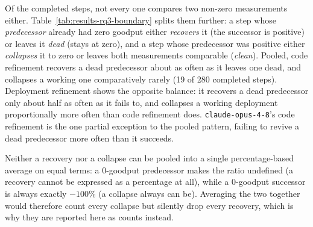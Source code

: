 \begin{table}[H]
  \centering
  \caption{Of the completed steps in Table~\ref{tab:results-rq3-funnel},
    how many crossed the zero-goodput boundary in either direction, versus
    how many compare two non-zero measurements (\emph{clean}, the
    population Table~\ref{tab:results-rq3-summary} summarises).}
  \label{tab:results-rq3-boundary}
  \small
\end{table}

Of the completed steps, not every one compares two non-zero measurements
either. Table~\ref{tab:results-rq3-boundary} splits them further: a step
whose \emph{predecessor} already had zero goodput either \emph{recovers}
it (the successor is positive) or leaves it \emph{dead} (stays at zero),
and a step whose predecessor was positive either \emph{collapses} it to
zero or leaves both measurements comparable (\emph{clean}). Pooled, code
refinement recovers a dead predecessor about as often as it leaves one
dead, and collapses a working one comparatively rarely (19 of 280
completed steps). Deployment refinement shows the opposite balance: it
recovers a dead predecessor only about half as often as it fails to, and
collapses a working deployment proportionally more often than code
refinement does. \texttt{claude-opus-4-8}'s code refinement is the one partial
exception to the pooled pattern, failing to revive a dead predecessor
more often than it succeeds.

Neither a recovery nor a collapse can be pooled into a single
percentage-based average on equal terms: a $0$-goodput predecessor makes
the ratio undefined (a recovery cannot be expressed as a percentage at
all), while a $0$-goodput successor is always exactly $-100\%$ (a collapse
always can be). Averaging the two together would therefore count every
collapse but silently drop every recovery, which is why they are reported
here as counts instead.

